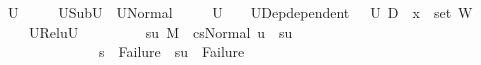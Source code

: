 \begin{isabellebody}
\ U{}\ \isanewline
\ \ \ \ U{}Sub{\isacharcolon}{\kern0pt}{\isachardoublequoteopen}U{}\ {\isasymsubseteq}\ {\isacharquery}{\kern0pt}U{}Normal{\isachardoublequoteclose}\ \isanewline
\ \ \ \ {\isachardoublequoteopen}U{}\ {\isasymnoteq}\ {\isacharbraceleft}{\kern0pt}{\isacharbraceright}{\kern0pt}{\isachardoublequoteclose}\ \ U{}Dep{\isacharcolon}{\kern0pt}{\isachardoublequoteopen}dependent\ {\isasymLambda}{\isacharprime}{\kern0pt}\ {\isasymOmega}\ U{}\ {\isacharparenleft}{\kern0pt}D{}\ {\isasymunion}\ {\isacharbraceleft}{\kern0pt}x{}{\isacharbraceright}{\kern0pt}\ {\isasymunion}\ set\ W{\isacharparenright}{\kern0pt}{\isachardoublequoteclose}\ \isanewline
\ \ \ \ U{}Rel{\isacharcolon}{\kern0pt}{\isachardoublequoteopen}{\isacharparenleft}{\kern0pt}{\isasymforall}u{\isasymin}U{}{\isachardot}{\kern0pt}\isanewline
\ \ \ \ \ \ \ \ \ {\isasymexists}su{\isachardot}{\kern0pt}\ {\isacharparenleft}{\kern0pt}M{\isacharcomma}{\kern0pt}{\isasymLambda}{\isacharprime}{\kern0pt}{\isacharcomma}{\kern0pt}{\isasymGamma}{\isacharcomma}{\kern0pt}{\isasymOmega}\ {\isasymturnstile}\ {\isasymlangle}cs{}{\isacharcomma}{\kern0pt}Normal\ u{\isasymrangle}\ {\isacharbrackleft}{\kern0pt}{\isasymrightarrow}{\isacharbrackright}{\kern0pt}\ su{\isacharparenright}{\kern0pt}\ {\isasymand}\isanewline
\ \ \ \ \ \ \ \ \ \ \ \ \ \ {\isacharparenleft}{\kern0pt}s{\isacharprime}{\kern0pt}\ {\isacharequal}{\kern0pt}\ Failure\ {\isasymlongrightarrow}\ su\ {\isacharequal}{\kern0pt}\ Failure{\isacharparenright}{\kern0pt}\ {\isasymand}\ \isanewline

\end{isabellebody}
